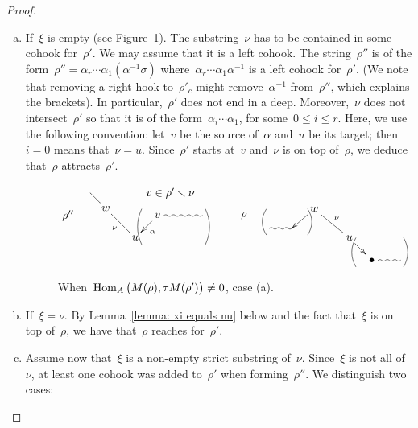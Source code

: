 \documentclass{memo-l}
\theoremstyle{definition}
\newcommand{\ssm}{\smallsetminus} %
\newcommand{\Hom}[1]{\operatorname{{\rm Hom}}_{#1}}
\begin{document}
\begin{proof}
\begin{enumerate}[(a)]
\item If~$\xi$ is empty (see Figure~\ref{fig:not tau compatible case a}).
The substring~$\nu$ has to be contained in some cohook for~$\rho'$.
We may assume that it is a left cohook.
The string~$\rho''$ is of the form~$\rho''= \alpha_r\cdots\alpha_1(\alpha^{-1}\sigma)$ where~$\alpha_r\cdots\alpha_1\alpha^{-1}$ is a left cohook for~$\rho'$.
(We note that removing a right hook to~$\rho'_c$ might remove~$\alpha^{-1}$ from~$\rho''$, which explains the brackets).
In particular,~$\rho'$ does not end in a deep.
Moreover,~$\nu$ does not intersect~$\rho'$ so that it is of the form~$\alpha_i\cdots\alpha_1$, for some~$0\leq i \leq r$.
Here, we use the following convention: let~$v$ be the source of~$\alpha$ and~$u$ be its target; then~$i=0$ means that~$\nu = u$.
Since~$\rho'$ starts at~$v$ and~$\nu$ is on top of~$\rho$, we deduce that~$\rho$ attracts~$\rho'$.

\begin{figure}[h]
 	\capstart
\[
\xy
%
(0,0)*+{\rho''};
(7,7)="1";
(11.8,2.2)*+{w}="2";
(21,-7)*+{u}="3";
(28,0)*+{v}="4";
(42,0)="6";
%
{\ar@{-} "1";"2"};
{\ar@{-}_{\nu} "2";"3"};
{\ar^{\alpha} "4";"3"};
{\ar@{~} "4";"6"};
%
{\ar@/^.3pc/@{-} (23,-9);(23,2)};
{\ar@/_.3pc/@{-} (43,-9);(43,2)};
%
(32,7)*+{v\in \rho'\ssm\nu};
%
%
%
(55,0)*+{\rho};
(63,-4)="11";
(70,-4)="12";
(77,2)*+{w}="13";
(88,-7)*+{u}="14";
(95,-14)*+{\bullet}="15";
(104,-14)="16";
%
{\ar@{~} "11";"12"};
{\ar "13";"12"};
{\ar@{-}^{\nu} "13";"14"};
{\ar "14";"15"};
{\ar@{~} "15";"16"};
%
{\ar@/^.3pc/@{-} (62,-6);(62,2)};
{\ar@/_.3pc/@{-} (75,-6);(75,2)};
%
{\ar@/_.3pc/@{-} (90,-7);(90,-16)};
{\ar@/^.3pc/@{-} (105,-7);(105,-16)};
%
\endxy
\]
    \caption{When~$\Hom{A} \big( M(\rho), \tau M(\rho') \big) \ne 0$, case (a).}
    \vspace{-.5cm}
    \label{fig:not tau compatible case a}
\end{figure}

\item If~$\xi=\nu$. By Lemma~\ref{lemma: xi equals nu} below and the fact that~$\xi$ is on top of~$\rho$, we have that~$\rho$ reaches for~$\rho'$. 

\item Assume now that~$\xi$ is a non-empty strict substring of~$\nu$. Since~$\xi$ is not all of~$\nu$, at least one cohook was added to~$\rho'$ when forming~$\rho''$. We distinguish two cases:


\end{enumerate}
\end{proof}
\end{document}
